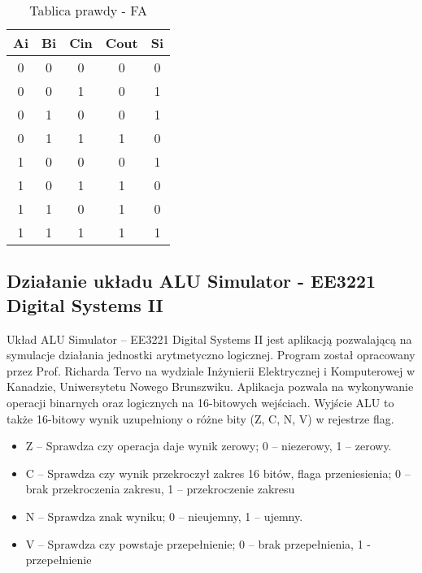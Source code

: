 \documentclass[12pt, a4paper, onside, polish]{article}				%
\begin{document}
\begin{table}
\noindent
\caption{Tablica prawdy - FA}
\centering
\begin{tabular}{|c|c|c|c|c|}
\hline
\textbf{Ai} & \textbf{Bi} & \textbf{Cin} & \textbf{Cout} & \textbf{Si} \\ \hline
0           & 0           & 0            & 0             & 0           \\ \hline
0           & 0           & 1            & 0             & 1           \\ \hline
0           & 1           & 0            & 0             & 1           \\ \hline
0           & 1           & 1            & 1             & 0           \\ \hline
1           & 0           & 0            & 0             & 1           \\ \hline
1           & 0           & 1            & 1             & 0           \\ \hline
1           & 1           & 0            & 1             & 0           \\ \hline
1           & 1           & 1            & 1             & 1           \\ \hline 
\end{tabular}
\vspace{0.5cm}
\end{table}

\subsection{Działanie układu ALU Simulator - EE3221 Digital Systems II}
\hspace{\parindent}
Układ ALU Simulator – EE3221 Digital Systems II jest aplikacją pozwalającą na symulacje działania jednostki arytmetyczno logicznej. Program został opracowany przez Prof. Richarda Tervo na wydziale Inżynierii Elektrycznej i Komputerowej w Kanadzie, Uniwersytetu Nowego Brunszwiku. Aplikacja pozwala na wykonywanie operacji binarnych oraz logicznych na 16-bitowych wejściach. Wyjście ALU to także 16-bitowy wynik uzupełniony o różne bity (Z, C, N, V) w rejestrze flag.
\begin{itemize}
\item Z – Sprawdza czy operacja daje wynik zerowy; 0 – niezerowy, 1 – zerowy.
\item C – Sprawdza czy wynik przekroczył zakres 16 bitów, flaga przeniesienia; 0 – brak przekroczenia zakresu, 1 – przekroczenie zakresu
\item N – Sprawdza znak wyniku; 0 – nieujemny, 1 – ujemny.
\item V – Sprawdza czy powstaje przepełnienie; 0 – brak przepełnienia, 1 - przepełnienie \newline
\end{itemize}
\end{document}

